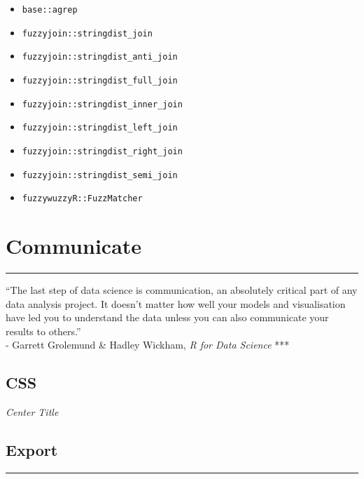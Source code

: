 \documentclass[
]{book}
\providecommand{\tightlist}{%
  \setlength{\itemsep}{0pt}\setlength{\parskip}{0pt}}
\begin{document}
\begin{itemize}
\tightlist
\item
  \texttt{base::agrep}
\item
  \texttt{fuzzyjoin::stringdist\_join}
\item
  \texttt{fuzzyjoin::stringdist\_anti\_join}
\item
  \texttt{fuzzyjoin::stringdist\_full\_join}
\item
  \texttt{fuzzyjoin::stringdist\_inner\_join}
\item
  \texttt{fuzzyjoin::stringdist\_left\_join}
\item
  \texttt{fuzzyjoin::stringdist\_right\_join}
\item
  \texttt{fuzzyjoin::stringdist\_semi\_join}
\item
  \texttt{fuzzywuzzyR::FuzzMatcher}
\end{itemize}

\hypertarget{communicate}{%
\chapter{Communicate}\label{communicate}}

\begin{center}\rule{0.5\linewidth}{0.5pt}\end{center}

``The last step of data science is communication, an absolutely critical part of any data analysis project. It doesn't matter how well your models and visualisation have led you to understand the data unless you can also communicate your results to others.''\\
- Garrett Grolemund \& Hadley Wickham, \emph{R for Data Science}
***

\hypertarget{css}{%
\section{CSS}\label{css}}

\emph{Center Title}

\hypertarget{export}{%
\section{Export}\label{export}}

\begin{center}\rule{0.5\linewidth}{0.5pt}\end{center}
\end{document}
